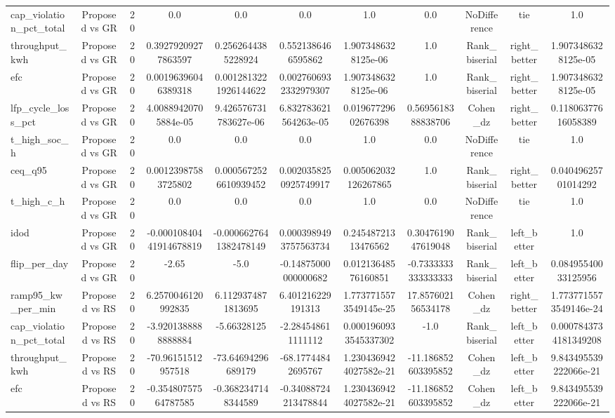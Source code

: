 \begin{table}[t]
\begin{tabular}{lcccccccccc}
cap\_violation\_pct\_total & Proposed vs GR & 20 & 0.0 & 0.0 & 0.0 & 1.0 & 0.0 & NoDifference & tie & 1.0 \\
throughput\_kwh & Proposed vs GR & 20 & 0.39279209277863597 & 0.2562644385228924 & 0.5521386466595862 & 1.9073486328125e-06 & 1.0 & Rank\_biserial & right\_better & 1.9073486328125e-05 \\
efc & Proposed vs GR & 20 & 0.00196396046389318 & 0.0012813221926144622 & 0.0027606932332979307 & 1.9073486328125e-06 & 1.0 & Rank\_biserial & right\_better & 1.9073486328125e-05 \\
lfp\_cycle\_loss\_pct & Proposed vs GR & 20 & 4.00889420705884e-05 & 9.426576731783627e-06 & 6.832783621564263e-05 & 0.01967729602676398 & 0.5695618388838706 & Cohen\_dz & right\_better & 0.11806377616058389 \\
t\_high\_soc\_h & Proposed vs GR & 20 & 0.0 & 0.0 & 0.0 & 1.0 & 0.0 & NoDifference & tie & 1.0 \\
ceq\_q95 & Proposed vs GR & 20 & 0.00123987583725802 & 0.0005672526610939452 & 0.0020358250925749917 & 0.005062032126267865 & 1.0 & Rank\_biserial & right\_better & 0.04049625701014292 \\
t\_high\_c\_h & Proposed vs GR & 20 & 0.0 & 0.0 & 0.0 & 1.0 & 0.0 & NoDifference & tie & 1.0 \\
idod & Proposed vs GR & 20 & -0.00010840441914678819 & -0.0006627641382478149 & 0.0003989493757563734 & 0.24548721313476562 & 0.3047619047619048 & Rank\_biserial & left\_better & 1.0 \\
flip\_per\_day & Proposed vs GR & 20 & -2.65 & -5.0 & -0.14875000000000682 & 0.01213648576160851 & -0.7333333333333333 & Rank\_biserial & left\_better & 0.08495540033125956 \\
ramp95\_kw\_per\_min & Proposed vs RS & 20 & 6.2570046120992835 & 6.1129374871813695 & 6.401216229191313 & 1.7737715573549145e-25 & 17.857602156534178 & Cohen\_dz & right\_better & 1.7737715573549146e-24 \\
cap\_violation\_pct\_total & Proposed vs RS & 20 & -3.9201388888888884 & -5.66328125 & -2.284548611111112 & 0.0001960933545337302 & -1.0 & Rank\_biserial & left\_better & 0.0007843734181349208 \\
throughput\_kwh & Proposed vs RS & 20 & -70.96151512957518 & -73.64694296689179 & -68.17744842695767 & 1.2304369424027582e-21 & -11.186852603395852 & Cohen\_dz & left\_better & 9.843495539222066e-21 \\
efc & Proposed vs RS & 20 & -0.35480757564787585 & -0.3682347148344589 & -0.34088724213478844 & 1.2304369424027582e-21 & -11.186852603395852 & Cohen\_dz & left\_better & 9.843495539222066e-21 \\

\end{tabular}
\end{table}
